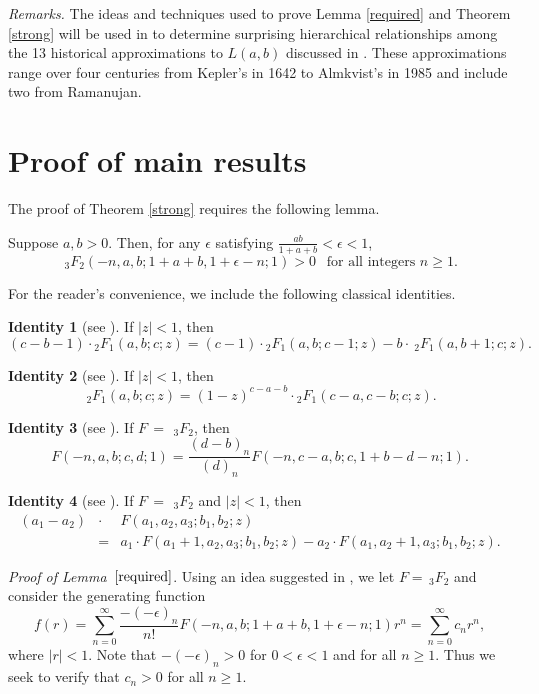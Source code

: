 \documentclass[final]{siamltex}
\begin{document}
{\em Remarks.} The ideas and techniques used to prove Lemma \ref{required} and Theorem \ref{strong} will be used in 
\cite{BPR} to determine surprising hierarchical relationships among the 13 historical approximations to $L(a,b)$ 
discussed in \cite{AB}.  These approximations range over four centuries from Kepler's in 1642 to Almkvist's in 1985 
and include two from Ramanujan.   

\section{Proof of main results}
The proof of Theorem \ref{strong} requires the following lemma.  


\begin{lemma}\label{required}
Suppose $a,b>0$. Then, for any $\epsilon $
satisfying $\frac{ab}{1+a+b}<\epsilon <1$, 
\[
\,_{3}F_{2}(-n,a,b;1+a+b,1+\epsilon -n;1)>0\ \ 
\mbox{ for all integers $n
\geq 1$.} 
\]
\end{lemma}

For the reader's convenience, we include the following classical
identities.

{\bf Identity 1} (see \cite [p. 558, eq. (15.2.24)]{AS}). If 
$|z|<1$, then 
\[
(c-b-1)\cdot {}_{2}F_{1}(a,b;c;z)=(c-1)\cdot {}_{2}F_{1}(a,b;c-1;z)-b\cdot {\ }_{2}F_{1}(a,b+1;c;z). 
\]

{\bf Identity 2} (see \cite[p. 60, Thm. 21]{R}). If $|z|<1$, then 
\[
{\ }_{2}F_{1}(a,b;c;z)=(1-z)^{c-a-b}\cdot {}_{2}F_{1}(c-a,c-b;c;z). 
\]

{\bf Identity 3} (see \cite[p. 59, eq. (3.1.1)]{GR}). If $F\,=\,{\ }_{3}F_{2}$, then 
\[
F(-n,a,b;c,d;1)=\frac{(d-b)_{n}}{(d)_{n}}F(-n,c-a,b;c,1+b-d-n;1). 
\]

{\bf Identity 4} (see \cite [p. 82, eq. (14)]{R}). If $F\,=\,{\ }_{3}F_{2}$ and $|z|<1$, then
\begin{eqnarray*}
(a_{1}-a_{2}) &\cdot & F(a_{1},a_{2},a_{3};b_{1},b_{2};z)\\&=&a_{1}\cdot
F(a_{1}+1,a_{2},a_{3};b_{1},b_{2};z)-a_{2}\cdot
F(a_{1},a_{2}+1,a_{3};b_{1},b_{2};z). 
\end{eqnarray*}

{\it Proof of Lemma~$\ref{required}$}.
Using an idea suggested in \cite
{2}, we let $F=\,_{3}F_{2}$ and consider the generating function 
\[
f(r)=\sum_{n=0}^{\infty }\frac{-(-\epsilon )_{n}}{n!}F(-n,a,b;1+a+b,1+\epsilon -n;1)r^{n}=
\sum_{n=0}^{\infty }c_{n}r^{n}, 
\]
where $|r|<1$. Note that $-(-\epsilon )_{n}>0$ for $0 < \epsilon < 1$ and for all $n\geq 1$. Thus we
seek to verify that $c_{n}>0$ for all $n\geq 1$.
\end{document}
